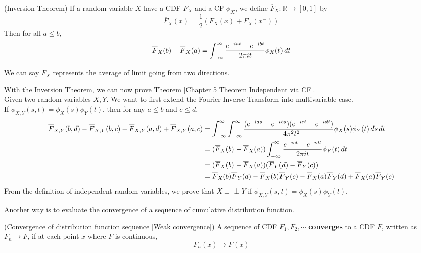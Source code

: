 \documentclass{huhtakm-template-book}
\newcommand{\independent}{\perp\!\!\!\perp}
\begin{document}
\begin{thm}(Inversion Theorem)
	If a random variable $X$ have a CDF $F_{X}$ and a CF $\phi_{X}$, we define $\overline{F}_{X}:\mathbb{R}\to[0,1]$ by
	\begin{equation*}
		\overline{F}_{X}(x)=\frac{1}{2}\left(F_{X}(x)+F_{X}(x^{-})\right)
	\end{equation*}
	Then for all $a\leq b$,
	\begin{equation*}
		\overline{F}_{X}(b)-\overline{F}_{X}(a)=\int_{-\infty}^{\infty}\frac{e^{-iat}-e^{-ibt}}{2\pi it}\phi_{X}(t)\,dt
	\end{equation*}
\end{thm}
\begin{rem}
	We can say $\overline{F}_{X}$ represents the average of limit going from two directions.
\end{rem}
\begin{eg}
	\label{Chapter 5 Example Proof of Theorem 5.27}
	With the Inversion Theorem, we can now prove Theorem \ref{Chapter 5 Theorem Independent via CF}.\\
	Given two random variables $X,Y$. We want to first extend the Fourier Inverse Transform into multivariable case.\\
	If $\phi_{X,Y}(s,t)=\phi_{X}(s)\phi_{Y}(t)$, then for any $a\leq b$ and $c\leq d$,
	\begin{align*}
		\overline{F}_{X,Y}(b,d)-\overline{F}_{X,Y}(b,c)-\overline{F}_{X,Y}(a,d)+\overline{F}_{X,Y}(a,c)&=\int_{-\infty}^{\infty}\int_{-\infty}^{\infty}\frac{(e^{-ias}-e^{-ibs})(e^{-ict}-e^{-idt})}{-4\pi^{2}t^{2}}\phi_{X}(s)\phi_{Y}(t)\,ds\,dt\\
		&=(\overline{F}_{X}(b)-\overline{F}_{X}(a))\int_{-\infty}^{\infty}\frac{e^{-ict}-e^{-idt}}{2\pi it}\phi_{Y}(t)\,dt\\
		&=(\overline{F}_{X}(b)-\overline{F}_{X}(a))(\overline{F}_{Y}(d)-\overline{F}_{Y}(c))\\
		&=\overline{F}_{X}(b)\overline{F}_{Y}(d)-\overline{F}_{X}(b)\overline{F}_{Y}(c)-\overline{F}_{X}(a)\overline{F}_{Y}(d)+\overline{F}_{X}(a)\overline{F}_{Y}(c)
	\end{align*}
	From the definition of independent random variables, we prove that $X\independent Y$ if $\phi_{X,Y}(s,t)=\phi_{X}(s)\phi_{Y}(t)$.
\end{eg}
\newpage
Another way is to evaluate the convergence of a sequence of cumulative distribution function.
\begin{defn}(Convergence of distribution function sequence [Weak convergence])
	A sequence of CDF 
	$F_{1},F_{2},\cdots$ \textbf{converges} to a CDF $F$, written as $F_{n}\to F$, if at each point $x$ where $F$ is continuous,
	\begin{equation*}
		F_{n}(x)\to F(x)
	\end{equation*}
\end{defn}
\end{document}
